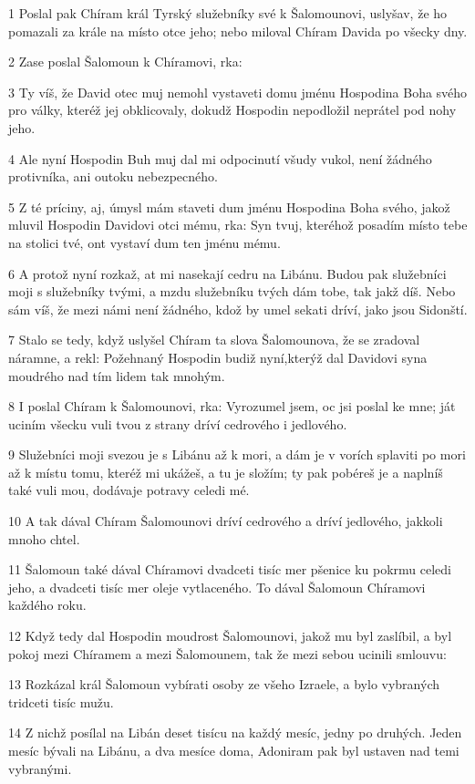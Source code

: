 \par 1 Poslal pak Chíram král Tyrský služebníky své k Šalomounovi, uslyšav, že ho pomazali za krále na místo otce jeho; nebo miloval Chíram Davida po všecky dny.
\par 2 Zase poslal Šalomoun k Chíramovi, rka:
\par 3 Ty víš, že David otec muj nemohl vystaveti domu jménu Hospodina Boha svého pro války, kteréž jej obklicovaly, dokudž Hospodin nepodložil neprátel pod nohy jeho.
\par 4 Ale nyní Hospodin Buh muj dal mi odpocinutí všudy vukol, není žádného protivníka, ani outoku nebezpecného.
\par 5 Z té príciny, aj, úmysl mám staveti dum jménu Hospodina Boha svého, jakož mluvil Hospodin Davidovi otci mému, rka: Syn tvuj, kteréhož posadím místo tebe na stolici tvé, ont vystaví dum ten jménu mému.
\par 6 A protož nyní rozkaž, at mi nasekají cedru na Libánu. Budou pak služebníci moji s služebníky tvými, a mzdu služebníku tvých dám tobe, tak jakž díš. Nebo sám víš, že mezi námi není žádného, kdož by umel sekati dríví, jako jsou Sidonští.
\par 7 Stalo se tedy, když uslyšel Chíram ta slova Šalomounova, že se zradoval náramne, a rekl: Požehnaný Hospodin budiž nyní,kterýž dal Davidovi syna moudrého nad tím lidem tak mnohým.
\par 8 I poslal Chíram k Šalomounovi, rka: Vyrozumel jsem, oc jsi poslal ke mne; ját uciním všecku vuli tvou z strany dríví cedrového i jedlového.
\par 9 Služebníci moji svezou je s Libánu až k mori, a dám je v vorích splaviti po mori až k místu tomu, kteréž mi ukážeš, a tu je složím; ty pak pobéreš je a naplníš také vuli mou, dodávaje potravy celedi mé.
\par 10 A tak dával Chíram Šalomounovi dríví cedrového a dríví jedlového, jakkoli mnoho chtel.
\par 11 Šalomoun také dával Chíramovi dvadceti tisíc mer pšenice ku pokrmu celedi jeho, a dvadceti tisíc mer oleje vytlaceného. To dával Šalomoun Chíramovi každého roku.
\par 12 Když tedy dal Hospodin moudrost Šalomounovi, jakož mu byl zaslíbil, a byl pokoj mezi Chíramem a mezi Šalomounem, tak že mezi sebou ucinili smlouvu:
\par 13 Rozkázal král Šalomoun vybírati osoby ze všeho Izraele, a bylo vybraných tridceti tisíc mužu.
\par 14 Z nichž posílal na Libán deset tisícu na každý mesíc, jedny po druhých. Jeden mesíc bývali na Libánu, a dva mesíce doma, Adoniram pak byl ustaven nad temi vybranými.
